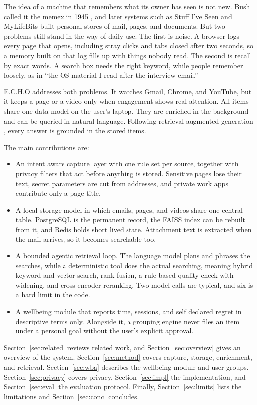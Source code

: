 \documentclass[conference]{IEEEtran}
\begin{document}
The idea of a machine that remembers what its owner has seen is not new. Bush called it the memex in 1945 \cite{b1}, and later systems such as Stuff I've Seen \cite{b2} and MyLifeBits \cite{b3} built personal stores of mail, pages, and documents. But two problems still stand in the way of daily use. The first is noise. A browser logs every page that opens, including stray clicks and tabs closed after two seconds, so a memory built on that log fills up with things nobody read. The second is recall by exact words. A search box needs the right keyword, while people remember loosely, as in ``the OS material I read after the interview email.''

E.C.H.O addresses both problems. It watches Gmail, Chrome, and YouTube, but it keeps a page or a video only when engagement shows real attention. All items share one data model on the user's laptop. They are enriched in the background and can be queried in natural language. Following retrieval augmented generation \cite{b4}, every answer is grounded in the stored items.

The main contributions are:
\begin{itemize}
\item An intent aware capture layer with one rule set per source, together with privacy filters that act before anything is stored. Sensitive pages lose their text, secret parameters are cut from addresses, and private work apps contribute only a page title.
\item A local storage model in which emails, pages, and videos share one central table. PostgreSQL is the permanent record, the FAISS index can be rebuilt from it, and Redis holds short lived state. Attachment text is extracted when the mail arrives, so it becomes searchable too.
\item A bounded agentic retrieval loop. The language model plans and phrases the searches, while a deterministic tool does the actual searching, meaning hybrid keyword and vector search, rank fusion, a rule based quality check with widening, and cross encoder reranking. Two model calls are typical, and six is a hard limit in the code.
\item A wellbeing module that reports time, sessions, and self declared regret in descriptive terms only. Alongside it, a grouping engine never files an item under a personal goal without the user's explicit approval.
\end{itemize}

Section~\ref{sec:related} reviews related work, and Section~\ref{sec:overview} gives an overview of the system. Section~\ref{sec:method} covers capture, storage, enrichment, and retrieval. Section~\ref{sec:wba} describes the wellbeing module and user groups. Section~\ref{sec:privacy} covers privacy, Section~\ref{sec:impl} the implementation, and Section~\ref{sec:eval} the evaluation protocol. Finally, Section~\ref{sec:limits} lists the limitations and Section~\ref{sec:conc} concludes.
\end{document}
